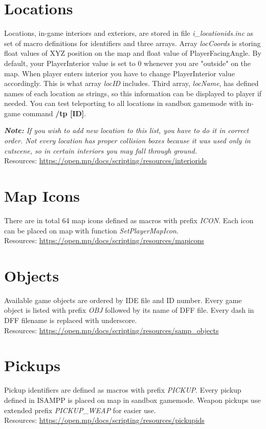 \documentclass{article}
\begin{document}
\section{Locations}
\begin{sloppypar}
Locations, in-game interiors and exteriors, are stored in file \textit{i\_locationids.inc} as set of macro definitions for identifiers and three arrays. Array \textit{locCoords} is storing float values of XYZ position on the map and float value of PlayerFacingAngle. By default, your PlayerInterior value is set to 0 whenever you are "outside" on the map. When player enters interior you have to change PlayerInterior value accordingly. This is what array \textit{locID} includes. Third array, \textit{locName}, has defined names of each location as strings, so this information can be displayed to player if needed. You can test teleporting to all locations in sandbox gamemode with in-game command \textbf{/tp [ID]}.
\end{sloppypar}
\bigskip
\noindent \textit{\textbf{Note:} If you wish to add new location to this list, you have to do it in correct order. Not every location has proper collision boxes because it was used only in cutscene, so in certain interiors you may fall through ground.}
\bigskip
\\Resources: \url{https://open.mp/docs/scripting/resources/interiorids}

\section{Map Icons}
There are in total 64 map icons defined as macros with prefix \textit{ICON}.  Each icon can be placed on map with function \textit{SetPlayerMapIcon}.
\bigskip
\\Resources: \url{https://open.mp/docs/scripting/resources/mapicons}

\section{Objects}
Available game objects are ordered by IDE file and ID number. Every game object is listed with prefix \textit{OBJ} followed by its name of DFF file. Every dash in DFF filename is replaced with underscore.
\bigskip
\\Resources: \url{https://open.mp/docs/scripting/resources/samp_objects}


\newpage
\section{Pickups}
Pickup identifiers are defined as macros with prefix \textit{PICKUP}. Every pickup defined in ISAMPP is placed on map in sandbox gamemode. Weapon pickups use extended prefix \textit{PICKUP\_WEAP} for easier use.
\bigskip
\\Resources: \url{https://open.mp/docs/scripting/resources/pickupids}
\end{document}
